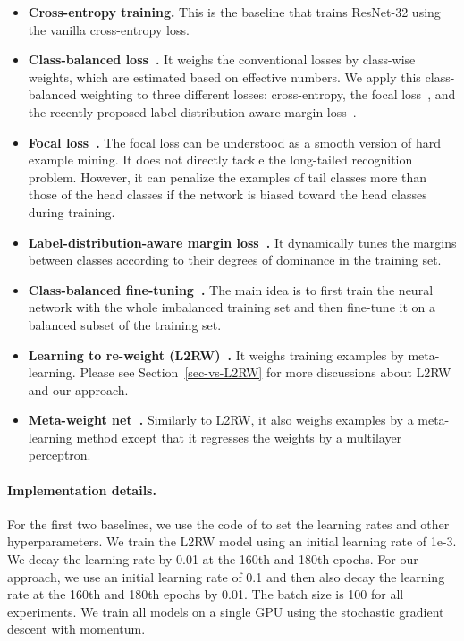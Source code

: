 \vspace{-10pt}
\begin{itemize}   \setlength\itemsep{-3pt}

\item \textbf{Cross-entropy training.} This is the baseline that trains ResNet-32 using the vanilla cross-entropy loss.

\item \textbf{Class-balanced loss~\cite{CBLoss}.}
It weighs the conventional losses by class-wise weights, which are estimated based on effective numbers. We apply this class-balanced weighting to three different losses: cross-entropy, the focal loss~\cite{Focalloss}, and the recently proposed label-distribution-aware margin loss~\cite{LDAM}.

\item \textbf{Focal loss~\cite{Focalloss}.} The focal loss can be understood as a smooth version of hard example mining. It does not directly tackle the long-tailed recognition problem. However, it can penalize the examples of tail classes more than those of the head classes if the network is biased toward the head classes during training. 


\item \textbf{Label-distribution-aware margin loss~\cite{LDAM}.} It dynamically tunes the margins between classes according to their degrees of dominance in the training set. 

\item \textbf{Class-balanced fine-tuning~\cite{Cui-Finetune}.} The main idea is to first train the neural network with the whole imbalanced training set and then fine-tune it on a balanced subset of the training set. 

\item \textbf{Learning to re-weight (L2RW)~\cite{L2RW}.} It weighs training examples by meta-learning. Please see Section~\ref{sec-vs-L2RW} for more discussions about L2RW and our approach.

\item \textbf{Meta-weight net~\cite{MWN}.} Similarly to L2RW, it also weighs examples by a meta-learning method except that it regresses the weights by a multilayer perceptron.

\vspace{-10pt}
\end{itemize}

\vspace{-10pt}
\paragraph{Implementation details.}
For the first two baselines, we use the code of \cite{CBLoss} to set the learning rates and other hyperparameters. We train the L2RW model using an initial learning rate of 1e-3. We decay the learning rate by 0.01 at the 160th and 180th epochs. For our approach, we use an initial learning rate of 0.1 and then also decay the learning rate at the 160th and 180th epochs by 0.01. The batch size is 100 for all experiments. We train all models on a single GPU using the stochastic gradient descent with momentum.

